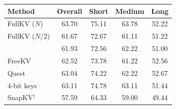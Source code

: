 \begin{tabular}{l|cccc}
\toprule
\textbf{Method} & Overall & Short & Medium & Long \\
\midrule
FullKV ($N$) & 63.70 & 75.11 & 63.78 & 52.22 \\
FullKV ($N/2$) & 61.67 & 72.67 & 61.11 & 51.22 \\
\midrule
\method{} & 61.93 & 72.56 & 62.22 & 51.00 \\
FreeKV & 62.52 & 73.78 & 61.22 & 52.56 \\
Quest & 63.04 & 74.22 & 62.22 & 52.67 \\
4-bit keys & 63.11 & 74.78 & 63.11 & 51.44 \\
SnapKV$^\dagger$ & 57.59 & 64.33 & 59.00 & 49.44 \\
\bottomrule
\end{tabular}
